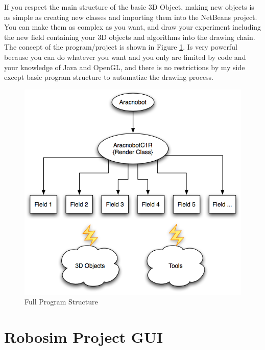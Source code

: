 \documentclass[12pt,a4paper,oneside,english]{book}
\begin{document}
If you respect the main structure of the basic 3D Object, making new objects is as simple as creating new classes and importing them into the NetBeans project. You can make them as complex as you want, and draw your experiment including the new field containing your 3D objects and algorithms into the drawing chain. The concept of the program/project is shown in Figure \ref{full program structure}. Is very powerful because you can do whatever you want and you only are limited by code and your knowledge of Java and OpenGL, and there is no restrictions by my side except basic program structure to automatize the drawing process.

\begin{figure}[htbp]
\begin{center}
\includegraphics[width=1.0\textwidth]{images/FPS.png}
\caption{Full Program Structure}
\label{full program structure}
\end{center}
\end{figure}


\mainmatter


\part{Robosim Project GUI}
\end{document}
